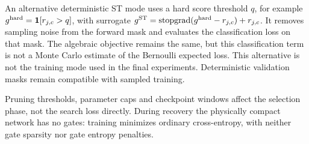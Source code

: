 An alternative deterministic ST mode uses a hard score threshold $q$,
for example $g^{\rm hard}=\mathbf1[r_{j,c}>q]$, with surrogate
$g^{\rm ST}=\operatorname{stopgrad}(g^{\rm hard}-r_{j,c})+r_{j,c}$.
It removes sampling noise from the forward mask and evaluates the
classification loss on that mask. The algebraic objective remains the
same, but this classification term is not a Monte Carlo estimate of
the Bernoulli expected loss. This alternative is not the training mode
used in the final experiments. Deterministic validation masks remain
compatible with sampled training.

Pruning thresholds, parameter caps and checkpoint windows affect the
selection phase, not the search loss directly. During recovery the
physically compact network has no gates: training minimizes ordinary
cross-entropy, with neither gate sparsity nor gate entropy penalties.
